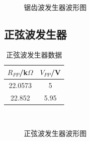 \documentclass[a4paper]{article}
\begin{document}
\begin{figure}[!h]
\centering
{}\qquad
{}\\
\caption{锯齿波发生器波形图}\label{datafig4}
\end{figure}

\newpage
\subsection{正弦波发生器}%
\begin{table}[!h]
\centering
\caption{正弦波发生器数据}
\label{data5}
\begin{tabular}{|c|c|}
\hline
$R_{PP}$/k$\Omega$ & $V_{PP}$/V \\ \hline
22.0573            & 5          \\ \hline
22.852             & 5.95       \\ \hline
\end{tabular}
\end{table}
\begin{figure}[!h]
\centering
{}\qquad
{}\\
\caption{正弦波发生器波形图}\label{datafig5}
\end{figure}
\end{document}
